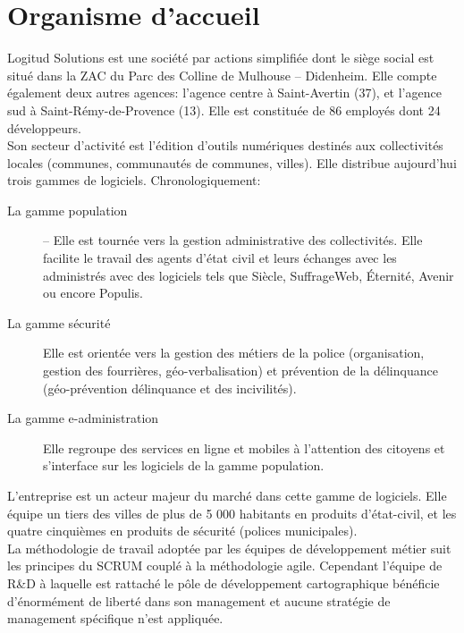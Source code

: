 \documentclass{rapportUHA40}
\begin{document}
\newpage

\section{Organisme d'accueil}
Logitud Solutions est une société par actions simplifiée dont le siège social
est situé dans la ZAC du Parc des Colline de Mulhouse – Didenheim. Elle compte
également deux autres agences: l'agence centre à Saint-Avertin (37), et
l’agence sud à Saint-Rémy-de-Provence (13). Elle est constituée de 86 employés
dont 24 développeurs. \\ Son secteur d'activité est l'édition d'outils
numériques destinés aux collectivités locales (communes, communautés de
communes, villes). Elle distribue aujourd'hui trois gammes de logiciels.
Chronologiquement:

\begin{description}
  \item[La gamme population] – Elle est tournée vers la gestion administrative des
    collectivités. Elle facilite le travail des agents d'état civil et leurs
    échanges avec les administrés avec des logiciels tels que Siècle, SuffrageWeb,
    Éternité, Avenir ou encore Populis.
  \item[La gamme sécurité] Elle est orientée vers la gestion des métiers de la police
    (organisation, gestion des fourrières, géo-verbalisation) et prévention de la
    délinquance (géo-prévention délinquance et des incivilités).
  \item[La gamme e-administration] Elle regroupe des services en ligne et mobiles à
    l'attention des citoyens et s'interface sur les logiciels de la gamme
    population.
\end{description}

L'entreprise est un acteur majeur du marché dans cette gamme de logiciels. Elle
équipe un tiers des villes de plus de 5 000 habitants en produits d’état-civil,
et les quatre cinquièmes en produits de sécurité (polices municipales).\\

La méthodologie de travail adoptée par les équipes de développement métier suit
les principes du \gls{SCRUM} couplé à la méthodologie \Gls{agile}. Cependant
l'équipe de R\&D à laquelle est rattaché le pôle de développement
cartographique bénéficie d'énormément de liberté dans son management et aucune
stratégie de management spécifique n'est appliquée.

\newpage
\end{document}
